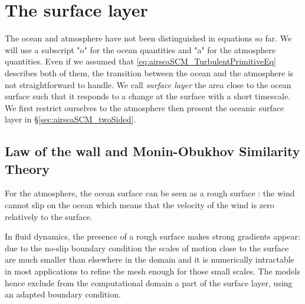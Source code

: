 \section{The surface layer}
\label{sec:airseaSCM_SL}
The ocean and atmosphere have not been distinguished in equations so far.
We will use a subscript "o" for the ocean quantities and "a" for the
atmosphere quantities.
Even if we assumed that \eqref{eq:airseaSCM_TurbulentPrimitiveEq}
describes both of them, the transition between the ocean and the
atmosphere is not straightforward to handle.
We call \textit{surface layer} the area close to the ocean surface
such that it responds to a change at the surface with a short
timescale.
We first restrict ourselves to the atmosphere then
present the oceanic surface layer in \S \ref{sec:airseaSCM_twoSided}.
\subsection{Law of the wall and Monin-Obukhov Similarity Theory}
For the atmosphere, the ocean surface can be seen as a
rough surface : the wind cannot slip on the ocean which
means that the velocity of the wind is zero
relatively to the surface.
\par
{}
\par
In fluid dynamics, the presence of a rough surface makes strong
gradients appear:
due to the no-slip boundary condition
the scales of motion close to the surface are much smaller than
elsewhere in the domain and it is numerically
intractable in most applications
to refine the mesh enough for those small scales.
The models hence exclude from the computational domain
a part of the surface layer, using an adapted boundary
condition.
%
